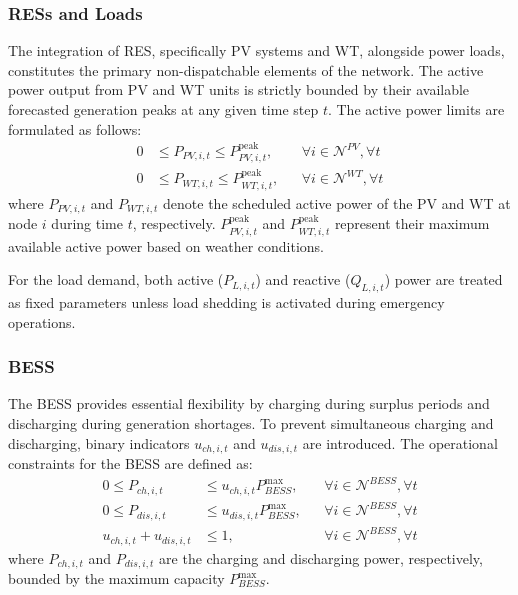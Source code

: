 \subsubsection{RESs and Loads}
The integration of RES, specifically PV systems and WT, alongside power loads, constitutes the primary non-dispatchable elements of the network. The active power output from PV and WT units is strictly bounded by their available forecasted generation peaks at any given time step $t$. The active power limits are formulated as follows:
\begin{subequations}
\begin{align}
    0 &\le P_{PV,i,t} \le P_{PV,i,t}^{\text{peak}}, && \forall i \in \mathcal{N}^{PV}, \forall t \label{eq:pv_limit} \\
    0 &\le P_{WT,i,t} \le P_{WT,i,t}^{\text{peak}}, && \forall i \in \mathcal{N}^{WT}, \forall t \label{eq:wt_limit}
\end{align}
\end{subequations}
where $P_{PV,i,t}$ and $P_{WT,i,t}$ denote the scheduled active power of the PV and WT at node $i$ during time $t$, respectively. $P_{PV,i,t}^{\text{peak}}$ and $P_{WT,i,t}^{\text{peak}}$ represent their maximum available active power based on weather conditions.

For the load demand, both active ($P_{L,i,t}$) and reactive ($Q_{L,i,t}$) power are treated as fixed parameters unless load shedding is activated during emergency operations.

\subsubsection{BESS}
The BESS provides essential flexibility by charging during surplus periods and discharging during generation shortages. To prevent simultaneous charging and discharging, binary indicators $u_{ch,i,t}$ and $u_{dis,i,t}$ are introduced. The operational constraints for the BESS are defined as:
\begin{subequations}
\begin{align}
    0 \le P_{ch,i,t} &\le u_{ch,i,t} P_{BESS}^{\max}, && \forall i \in \mathcal{N}^{BESS}, \forall t \label{eq:bess_char_limit} \\
    0 \le P_{dis,i,t} &\le u_{dis,i,t} P_{BESS}^{\max}, && \forall i \in \mathcal{N}^{BESS}, \forall t \label{eq:bess_dis_limit} \\
    u_{ch,i,t} + u_{dis,i,t} &\le 1, && \forall i \in \mathcal{N}^{BESS}, \forall t \label{eq:bess_binary_limit}
\end{align}
\end{subequations}
where $P_{ch,i,t}$ and $P_{dis,i,t}$ are the charging and discharging power, respectively, bounded by the maximum capacity $P_{BESS}^{\max}$.

